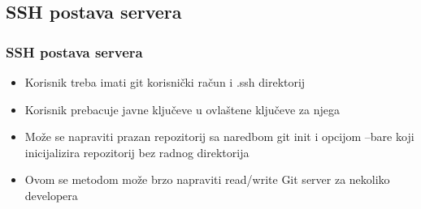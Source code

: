 \subsection{SSH postava servera}

\begin{frame}
\frametitle{SSH postava servera}
\begin{itemize}
	\item Korisnik treba imati git korisnički račun i .ssh direktorij
	\item Korisnik prebacuje javne ključeve u ovlaštene ključeve za njega
	\item Može se napraviti prazan repozitorij sa naredbom git init i opcijom --bare koji inicijalizira repozitorij bez radnog direktorija
	\item Ovom se metodom može brzo napraviti read/write Git server za nekoliko developera
\end{itemize}
\end{frame}